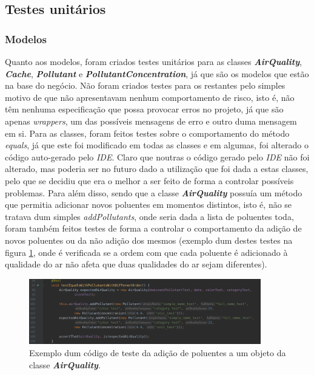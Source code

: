 \subsection{Testes unitários}
\subsubsection{Modelos}
Quanto aos modelos, foram criados testes unitários para as classes \textbf{\textit{AirQuality}}, \textbf{\textit{Cache}}, \textbf{\textit{Pollutant}} e \textbf{\textit{PollutantConcentration}}, já que são os modelos que estão na base do negócio. Não foram criados testes para os restantes pelo simples motivo de que não apresentavam nenhum comportamento de risco, isto é, não têm nenhuma especificação que possa provocar erros no projeto, já que são apenas \textit{wrappers}, um das possíveis mensagens de erro e outro duma mensagem em si. 
Para as classes, foram feitos testes sobre o comportamento do método \textit{equals}, já que este foi modificado em todas as classes e em algumas, foi alterado o código auto-gerado pelo \textit{IDE}. Claro que noutras o código gerado pelo \textit{IDE} não foi alterado, mas poderia ser no futuro dado a utilização que foi dada a estas classes, pelo que se decidiu que era o melhor a ser feito de forma a controlar possíveis problemas.
Para além disso, sendo que a classe \textbf{\textit{AirQuality}} possuía um método que permitia adicionar novos poluentes em momentos distintos, isto é, não se tratava dum simples \textit{addPollutants}, onde seria dada a lista de poluentes toda, foram também feitos testes de forma a controlar o comportamento da adição de novos poluentes ou da não adição dos mesmos (exemplo dum destes testes na figura \ref{fig:air_pollutant_test}, onde é verificada se a ordem com que cada poluente é adicionado à qualidade do ar não afeta que duas qualidades do ar sejam diferentes).


\begin{figure}[h]
   \centering
   \includegraphics[width=0.90\textwidth]{images/air_pollutant_test}
   \caption{Exemplo dum código de teste da adição de poluentes a um objeto da classe \textbf{\textit{AirQuality}}.}
   \label{fig:air_pollutant_test}
\end{figure}

